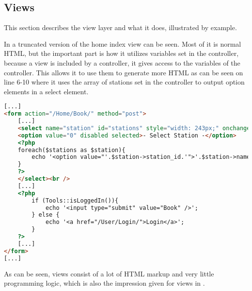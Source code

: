 \subsection{Views}
This section describes the view layer and what it does, illustrated by example.

In  a truncated version of the home index view can be seen. 
Most of it is normal HTML, but the important part is how it utilizes variables set in the controller, because a view is included by a controller, it gives access to the variables of the controller. 
This allows it to use them to generate more HTML as can be seen on line 6-10 where it uses the array of stations set in the controller to output option elements in a select element.

\begin{lstlisting}[language=html, label=lst:homeIndexView, caption={Home Index View}]
[...]
<form action="/Home/Book/" method="post">
    [...]
    <select name="station" id="stations" style="width: 243px;" onchange="UpdateMarker()">
    <option value="0" disabled selected>- Select Station -</option>
    <?php
    foreach($stations as $station){
        echo '<option value="'.$station->station_id.'">'.$station->name.'</option>';
    }
    ?>
    </select><br />
    [...]
    <?php
        if (Tools::isLoggedIn()){
            echo '<input type="submit" value="Book" />';
        } else {
            echo '<a href="/User/Login/">Login</a>';
        }
    ?>
    [...]
</form>
[...]
\end{lstlisting}

As can be seen, views consist of a lot of HTML markup and very little programming logic, which is also the impression given for views in .